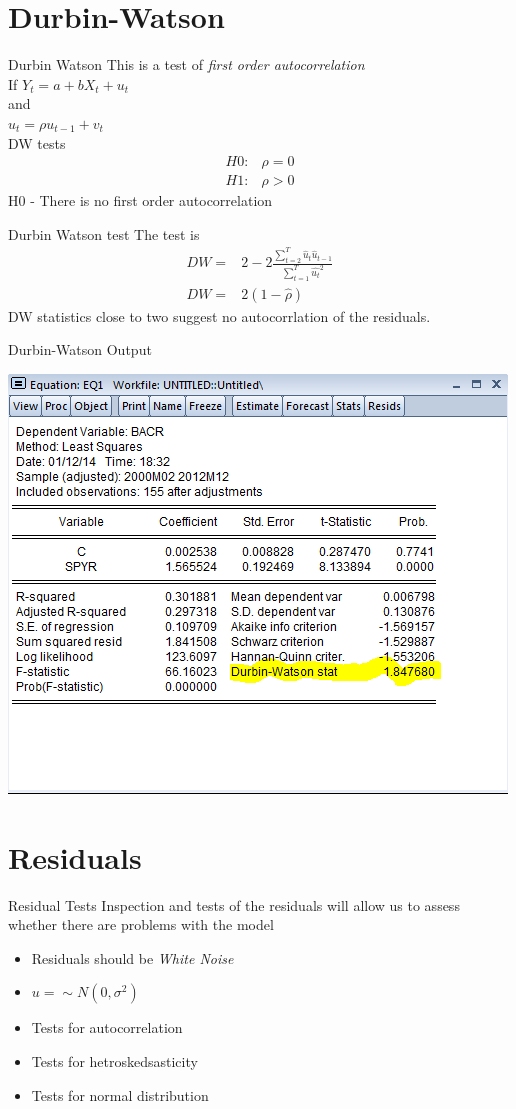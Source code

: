\documentclass[14pt,xcolor=pdftex,dvipsnames,table]{beamer}\usepackage[]{graphicx}\usepackage[]{color}
\begin{document}
\section{Durbin-Watson}
\begin{frame}{Durbin Watson}
This is a test of \emph{first order autocorrelation}\\
If 
$Y_t = a + b X_t + u_t$\\
and \\
$u_t = \rho u_{t-1} + v_t$\\
DW tests 
\begin{align*}
H0:& \rho = 0\\
H1:& \rho > 0
\end{align*}
H0 - There is no first order autocorrelation
\end{frame}

\begin{frame}{Durbin Watson test}
The test is 
\begin{align*}
DW =& 2 - 2 \frac{\sum_{t = 2}^T \hat{u}_t \hat{u}_{t-1}}{\sum_{t=1}^T \hat{u_t}^2}\\
DW =& 2(1 - \hat{\rho})
\end{align*}
DW statistics close to two suggest no autocorrlation of the residuals.
\end{frame}

\begin{frame}{Durbin-Watson Output}
\graphicspath{{./Figures/}}
\begin{center}
\includegraphics[height = 3 in]{DW}
\end{center}
\end{frame}


\section{Residuals}
\begin{frame}{Residual Tests}
Inspection and tests of the residuals will allow us to assess whether there are problems with the model
\begin{itemize}[<+-| alert@+>]
\item Residuals should be \emph{White Noise}
\item $u =\sim N(0, \sigma^2)$
\item Tests for autocorrelation
\item Tests for hetroskedsasticity
\item Tests for normal distribution
\end{itemize}
\end{frame}
\end{document}
